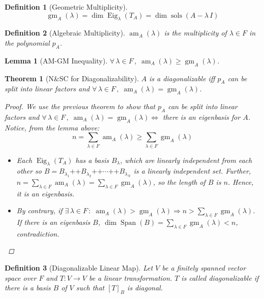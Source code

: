 \documentclass[12pt]{article}
\let\RA\Rightarrow
\let\LA\Leftarrow
\let\LR\Leftrightarrow
\newcommand{\Forall}[1]{\forall\,{#1}\,,\;}
\newcommand{\Exist}[1]{\exists\,{#1}\,:\;}
\DeclareMathOperator{\Span}{Span}
\DeclareMathOperator{\sols}{sols}
\DeclareMathOperator{\concat}{++}
\DeclareMathOperator{\Eig}{Eig}
\DeclareMathOperator{\am}{am}
\DeclareMathOperator{\gm}{gm}
\newtheorem{theorem}{Theorem}[subsection]
\newtheorem{definition}{Definition}[subsection]
\newtheorem{lemma}{Lemma}[subsection]
\begin{document}
\begin{definition}[Geometric Multiplicity]
  $$\gm_A(\lambda)=\dim\Eig_\lambda(T_A)=\dim\sols(A-\lambda\,I)$$
\end{definition}

\begin{definition}[Algebraic Multiplicity]
  $\am_A(\lambda)$ is the multiplicity of $\lambda\in F$ in the polynomial $p_A$.
\end{definition}

\begin{lemma}[AM-GM Inequality]
  $\Forall{\lambda\in F}\am_{A}(\lambda)\geq\gm_A(\lambda)$.
\end{lemma}

\begin{theorem}[N\&SC for Diagonalizability]
  $A$ is a diagonalizable iff $p_A$ can be split into linear factors and $\Forall{\lambda\in F}\am_{A}(\lambda)=\gm_A(\lambda)$.
  \begin{proof}
    We use the previous theorem to show that $p_A$ can be split into linear factors and $\Forall{\lambda\in F}\am_{A}(\lambda)=\gm_A(\lambda)\LR$ there is an eigenbasis for $A$. Notice, from the lemma above: $$n=\sum_{\lambda\in F}\am_A(\lambda)\geq \sum_{\lambda\in F}\gm_A(\lambda)$$
    \begin{itemize}
      \item [$(\RA)$] Each $\Eig_\lambda(T_A)$ has a basis $B_\lambda$, which are linearly independent from each other so $B=B_{\lambda_1}\concat B_{\lambda_2}\concat\cdots\concat B_{\lambda_N}$ is a linearly independent set. Further, $n=\sum_{\lambda\in F}\am_A(\lambda)=\sum_{\lambda\in F}\gm_A(\lambda)$, so the length of $B$ is $n$. Hence, it is an eigenbasis.
      \item [$(\LA)$] By contrary, if $\Exist{\lambda\in F}\am_A(\lambda)>\gm_A(\lambda)\RA n>\sum_{\lambda\in F}\gm_A(\lambda)$. If there is an eigenbasis $B$, $\dim\Span(B)=\sum_{\lambda\in F}\gm_A(\lambda)<n$, contradiction.
    \end{itemize}
  \end{proof}
\end{theorem}

\begin{definition}[Diagonalizable Linear Map]
  Let $V$ be a finitely spanned vector space over $F$ and $T: V \to V$ be a linear transformation. $T$ is called diagonalizable if there is a basis $B$ of $V$ such that $[T]_B$ is diagonal.
\end{definition}
\end{document}
